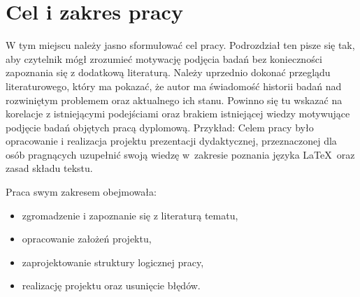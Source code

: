 \section{Cel i zakres pracy}

W tym miejscu należy jasno sformułować cel pracy. Podrozdział ten pisze się tak, aby czytelnik mógł zrozumieć motywację podjęcia badań bez konieczności zapoznania się z dodatkową literaturą. Należy uprzednio dokonać przeglądu literaturowego, który ma pokazać, że autor ma świadomość historii badań nad rozwiniętym problemem oraz aktualnego ich stanu. Powinno się tu wskazać na korelacje z istniejącymi podejściami oraz brakiem istniejącej wiedzy motywujące podjęcie badań objętych pracą dyplomową.
Przykład: Celem pracy było opracowanie i realizacja projektu prezentacji dydaktycznej, przeznaczonej dla osób pragnących uzupełnić swoją wiedzę w~zakresie poznania języka \LaTeX\ oraz zasad składu tekstu.

Praca swym zakresem obejmowała:
\begin{itemize}

\item zgromadzenie i zapoznanie się z literaturą tematu,
\item opracowanie założeń projektu,
\item zaprojektowanie struktury logicznej pracy,
\item realizację projektu oraz usunięcie błędów.
\end{itemize}